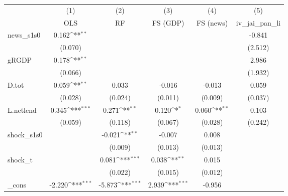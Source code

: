 {
\def\sym#1{\ifmmode^{#1}\else\(^{#1}\)\fi}
\begin{tabular}{l*{5}{c}}
\toprule
            &\multicolumn{1}{c}{(1)}&\multicolumn{1}{c}{(2)}&\multicolumn{1}{c}{(3)}&\multicolumn{1}{c}{(4)}&\multicolumn{1}{c}{(5)}\\
            &\multicolumn{1}{c}{OLS}&\multicolumn{1}{c}{RF}&\multicolumn{1}{c}{FS (GDP)}&\multicolumn{1}{c}{FS (news)}&\multicolumn{1}{c}{iv\_jai\_pan\_li}\\
\midrule
news\_s1s0   &       0.162\sym{**} &                     &                     &                     &      -0.841         \\
            &     (0.070)         &                     &                     &                     &     (2.512)         \\
\addlinespace
gRGDP       &       0.178\sym{**} &                     &                     &                     &       2.986         \\
            &     (0.066)         &                     &                     &                     &     (1.932)         \\
\addlinespace
D.tot       &       0.059\sym{**} &       0.033         &      -0.016         &      -0.013         &       0.059         \\
            &     (0.028)         &     (0.024)         &     (0.011)         &     (0.009)         &     (0.037)         \\
\addlinespace
L.netlend   &       0.345\sym{***}&       0.271\sym{**} &       0.120\sym{*}  &       0.060\sym{**} &       0.103         \\
            &     (0.059)         &     (0.118)         &     (0.067)         &     (0.028)         &     (0.242)         \\
\addlinespace
shock\_s1s0  &                     &      -0.021\sym{**} &      -0.007         &       0.008         &                     \\
            &                     &     (0.009)         &     (0.013)         &     (0.013)         &                     \\
\addlinespace
shock\_t     &                     &       0.081\sym{***}&       0.038\sym{**} &       0.015         &                     \\
            &                     &     (0.022)         &     (0.015)         &     (0.012)         &                     \\
\addlinespace
\_cons      &      -2.220\sym{***}&      -5.873\sym{***}&       2.939\sym{***}&      -0.956         &                     \\

\end{tabular}}
